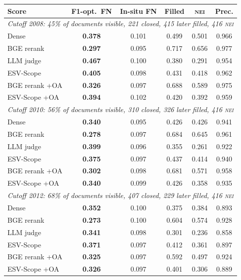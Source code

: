 \setlength{\tabcolsep}{3pt}
\begin{tabular}{lccccc}
\toprule
Score & F1-opt.\ FN & In-situ FN & Filled & \textsc{nei} & Prec. \\
\midrule
\multicolumn{6}{l}{\textit{Cutoff 2008: 45\% of documents visible, 221 closed, 415 later filled, 416 \textup{\textsc{nei}}}} \\
Dense & \textbf{0.378} & 0.101 & 0.499 & 0.501 & 0.966 \\
BGE rerank & \textbf{0.297} & 0.095 & 0.717 & 0.656 & 0.977 \\
LLM judge & \textbf{0.467} & 0.100 & 0.380 & 0.291 & 0.954 \\
ESV-Scope & \textbf{0.405} & 0.098 & 0.431 & 0.418 & 0.962 \\
BGE rerank +OA & \textbf{0.326} & 0.097 & 0.688 & 0.589 & 0.975 \\
ESV-Scope +OA & \textbf{0.394} & 0.102 & 0.420 & 0.392 & 0.959 \\
\multicolumn{6}{l}{\textit{Cutoff 2010: 56\% of documents visible, 310 closed, 326 later filled, 416 \textup{\textsc{nei}}}} \\
Dense & \textbf{0.340} & 0.095 & 0.426 & 0.426 & 0.941 \\
BGE rerank & \textbf{0.278} & 0.097 & 0.684 & 0.645 & 0.961 \\
LLM judge & \textbf{0.399} & 0.096 & 0.355 & 0.261 & 0.922 \\
ESV-Scope & \textbf{0.375} & 0.097 & 0.437 & 0.414 & 0.940 \\
BGE rerank +OA & \textbf{0.302} & 0.098 & 0.681 & 0.571 & 0.958 \\
ESV-Scope +OA & \textbf{0.340} & 0.099 & 0.426 & 0.358 & 0.935 \\
\multicolumn{6}{l}{\textit{Cutoff 2012: 68\% of documents visible, 407 closed, 229 later filled, 416 \textup{\textsc{nei}}}} \\
Dense & \textbf{0.352} & 0.100 & 0.375 & 0.384 & 0.893 \\
BGE rerank & \textbf{0.273} & 0.100 & 0.604 & 0.574 & 0.928 \\
LLM judge & \textbf{0.341} & 0.098 & 0.301 & 0.236 & 0.858 \\
ESV-Scope & \textbf{0.371} & 0.097 & 0.412 & 0.361 & 0.897 \\
BGE rerank +OA & \textbf{0.325} & 0.097 & 0.592 & 0.497 & 0.924 \\
ESV-Scope +OA & \textbf{0.326} & 0.097 & 0.401 & 0.306 & 0.889 \\
\bottomrule
\end{tabular}
